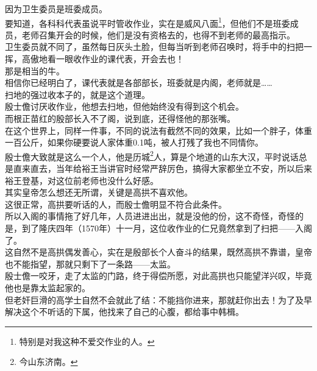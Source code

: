 \begin{multicols}{\theparacolNo}
因为卫生委员是班委成员。\\

要知道，各科科代表虽说平时管收作业，实在是威风八面\footnote{特别是对我这种不爱交作业的人。}，但他们不是班委成员，老师召集开会的时候，他们是没有资格去的，也得不到老师的最高指示。\\

卫生委员就不同了，虽然每日灰头土脸，但每当听到老师召唤时，将手中的扫把一挥，高傲地看一眼收作业的课代表，开会去也！\\

那是相当的牛。\\

相信你已经明白了，课代表就是各部部长，班委就是内阁，老师就是……\\

扫地的强过收本子的，就是这个道理。\\

殷士儋讨厌收作业，他想去扫地，但他始终没有得到这个机会。\\

而根正苗红的殷部长入不了阁，说到底，还得怪他的那张嘴。\\

在这个世界上，同样一件事，不同的说法有截然不同的效果，比如一个胖子，体重一百公斤，如果你硬要说人家体重0.1吨，被人打残了我也不同情你。\\

殷士儋大致就是这么一个人，他是历城\footnote{今山东济南。}人，算是个地道的山东大汉，平时说话总是直来直去，当年给裕王当讲官时经常严辞厉色，搞得大家都坐立不安，所以后来裕王登基，对这位前老师也没什么好感。\\

其实皇帝怎么想还无所谓，关键是高拱不喜欢他。\\

这很正常，高拱要听话的人，而殷士儋明显不符合此条件。\\

所以入阁的事情拖了好几年，人员进进出出，就是没他的份，这不奇怪，奇怪的是，到了隆庆四年（1570年）十一月，这位收作业的仁兄竟然拿到了扫把——入阁了。\\

这自然不是高拱偶发善心，实在是殷部长个人奋斗的结果，既然高拱不靠谱，皇帝也不能指望，那就只剩下了一条路——太监。\\

殷士儋一咬牙，走了太监的门路，终于得偿所愿，对此高拱也只能望洋兴叹，毕竟他也是靠太监起家的。\\

但老奸巨滑的高学士自然不会就此了结：不能挡你进来，那就赶你出去！为了及早解决这个不听话的下属，他找来了自己的心腹，都给事中韩楫。\\


\end{multicols}
